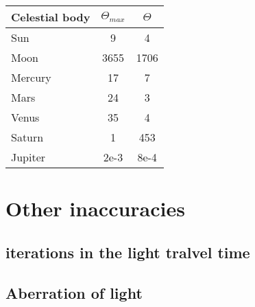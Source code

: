 \documentclass[%
a4paper,%
pagesize,%
12pt,%
parskip=off,%
bibliography=totoc,%
numbers=noenddot,%
DIV=12,%
twoside=semi,%
normalheadings%
]{scrbook}
\let\mychapter\chapter
\let\mysection\section
\begin{document}
\begin{center}
\begin{tabular}{|l|S|S|}
\hline
\textbf{Celestial body} &  &   \\\hline
Sun & 9 & 4\\\hline %
Moon & 3655 & 1706\\\hline %
Mercury & 17 & 7\\\hline %
Mars & 24 & 3\\\hline %
Venus & 35 & 4\\\hline %
Saturn & 1 & 453\\\hline %
Jupiter & 2e-3 & 8e-4 \\\hline %
\end{tabular}
\end{center}

\mychapter{Other inaccuracies}

\mysection{iterations in the light tralvel time}

\mysection{Aberration of light}
\end{document}
